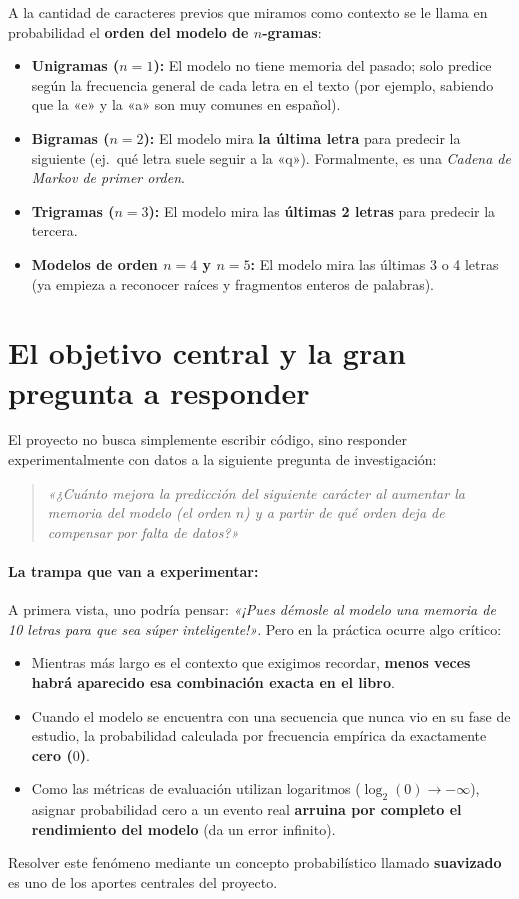 \documentclass[11pt,letterpaper]{article}
\begin{document}
A la cantidad de caracteres previos que miramos como contexto se le llama en probabilidad el \textbf{orden del modelo de $n$-gramas}:
\begin{itemize}[leftmargin=1.0cm, itemsep=1pt, parsep=0pt]
    \item \textbf{Unigramas ($n = 1$):} El modelo no tiene memoria del pasado; solo predice según la frecuencia general de cada letra en el texto (por ejemplo, sabiendo que la «e» y la «a» son muy comunes en español).
    \item \textbf{Bigramas ($n = 2$):} El modelo mira \textbf{la última letra} para predecir la siguiente (ej.\ qué letra suele seguir a la «q»). Formalmente, es una \textit{Cadena de Markov de primer orden}.
    \item \textbf{Trigramas ($n = 3$):} El modelo mira las \textbf{últimas 2 letras} para predecir la tercera.
    \item \textbf{Modelos de orden $n = 4$ y $n = 5$:} El modelo mira las últimas 3 o 4 letras (ya empieza a reconocer raíces y fragmentos enteros de palabras).
\end{itemize}

\section{El objetivo central y la gran pregunta a responder}

El proyecto no busca simplemente escribir código, sino responder experimentalmente con datos a la siguiente pregunta de investigación:

\begin{quote}
\centering
\textit{«¿Cuánto mejora la predicción del siguiente carácter al aumentar la memoria del modelo (el orden $n$) y a partir de qué orden deja de compensar por falta de datos?»}
\end{quote}

\paragraph{La trampa que van a experimentar:}
A primera vista, uno podría pensar: \textit{«¡Pues démosle al modelo una memoria de 10 letras para que sea súper inteligente!»}. Pero en la práctica ocurre algo crítico:
\begin{itemize}[leftmargin=1.0cm, itemsep=1pt, parsep=0pt]
    \item Mientras más largo es el contexto que exigimos recordar, \textbf{menos veces habrá aparecido esa combinación exacta en el libro}.
    \item Cuando el modelo se encuentra con una secuencia que nunca vio en su fase de estudio, la probabilidad calculada por frecuencia empírica da exactamente \textbf{cero ($0$)}.
    \item Como las métricas de evaluación utilizan logaritmos ($\log_2(0) \to -\infty$), asignar probabilidad cero a un evento real \textbf{arruina por completo el rendimiento del modelo} (da un error infinito).
\end{itemize}
Resolver este fenómeno mediante un concepto probabilístico llamado \textbf{suavizado} es uno de los aportes centrales del proyecto.
\end{document}
